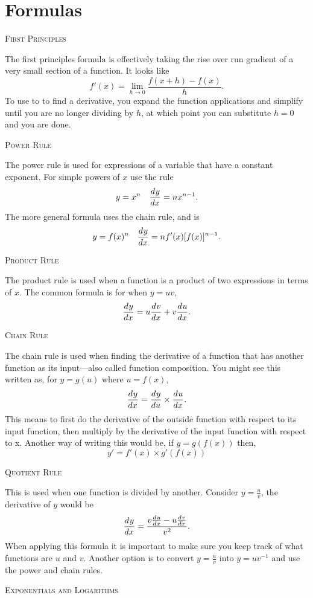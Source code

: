 \documentclass[a4paper,10pt]{article}
\newcommand{\deriv}[3][ ]{\ensuremath\frac{d^{#1}#2}{d#3^{#1}}}
\begin{document}
\section*{Formulas}
\begin{multicols*}{2}
{\large\textsc{First Principles}}

The first principles formula is effectively taking the rise over run 
gradient of a very small section of a function. It looks like
$$f'(x) = \lim_{h\to 0}\frac{f(x + h) - f(x)}{h}.$$
To use to to find a derivative, you expand the function applications 
and simplify until you are no longer dividing by $h$, at which point 
you can substitute $h=0$ and you are done.

{\large\textsc{Power Rule}}

The power rule is used for expressions of a variable that have a constant 
exponent. For simple powers of $x$ use the rule 
$$y = x^n \quad \deriv{y}{x} = nx^{n-1}.$$
The more general formula uses the chain rule, and is
$$y = f(x)^n \quad \deriv{y}{x} = nf'(x)[f(x)]^{n-1}.$$

{\large\textsc{Product Rule}}

The product rule is used when a function is a product of two expressions 
in terms of $x$. The common formula is for when $y = uv$,
$$\deriv{y}{x} = u\deriv{v}{x} + v\deriv{u}{x}.$$

{\large\textsc{Chain Rule}}

The chain rule is used when finding the derivative of a function that 
has another function as its input---also called function composition.
You might see this written as, for $y = g(u)$ where $u = f(x)$, 
$$\deriv{y}{x} = \deriv{y}{u} \times \deriv{u}{x}.$$
This means to first do the derivative of the outside function with 
respect to its input function, then multiply by the derivative of the 
input function with respect to x. Another way of writing this would 
be, if $y = g(f(x))$ then,
$$y' = f'(x) \times g'(f(x))$$

{\large\textsc{Quotient Rule}}

This is used when one function is divided by another. Consider
$y = \frac{u}{v}$, the derivative of $y$ would be 
$$\deriv{y}{x} = \frac{v\deriv{u}{x} - u\deriv{v}{x}}{v^2}.$$
When applying this formula it is important to make sure you 
keep track of what functions are $u$ and $v$. Another option is to 
convert $y = \frac{u}{v}$ into $y = uv^{-1}$ and use the power 
and chain rules.

{\large\textsc{Exponentials and Logarithms}}


\end{multicols*}
\end{document}
